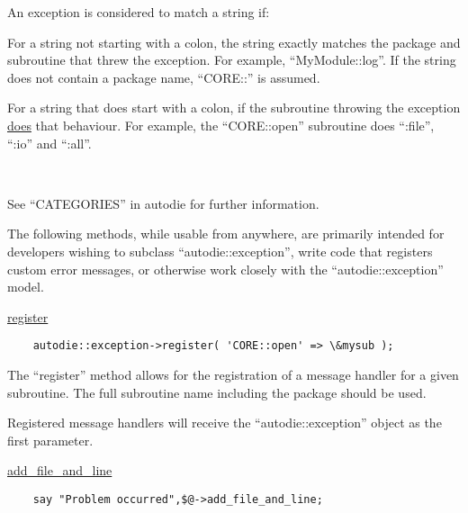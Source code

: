 \documentclass[]{article}
\renewcommand{\emph}[1]{\underline{#1}}
\begin{document}
An exception is considered to match a string if:

\begin{description}
\itemsep1pt\parskip0pt
\item[•]
For a string not starting with a colon, the string exactly matches the
package and subroutine that threw the exception. For example,
``MyModule::log''. If the string does not contain a package name,
``CORE::'' is assumed.
\end{description}

\begin{description}
\itemsep1pt\parskip0pt
\item[•]
For a string that does start with a colon, if the subroutine throwing
the exception \emph{does} that behaviour. For example, the
``CORE::open'' subroutine does ``:file'', ``:io'' and ``:all''.

~

See ``CATEGORIES'' in autodie for further information.
\end{description}


The following methods, while usable from anywhere, are primarily
intended for developers wishing to subclass ``autodie::exception'',
write code that registers custom error messages, or otherwise work
closely with the ``autodie::exception'' model.

\emph{register}

\begin{verbatim}
    autodie::exception->register( 'CORE::open' => \&mysub );
\end{verbatim}

The ``register'' method allows for the registration of a message handler
for a given subroutine. The full subroutine name including the package
should be used.

Registered message handlers will receive the ``autodie::exception''
object as the first parameter.

\emph{add\_file\_and\_line}

\begin{verbatim}
    say "Problem occurred",$@->add_file_and_line;
\end{verbatim}
\end{document}

